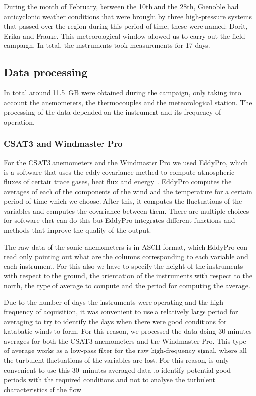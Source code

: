 During the month of February, between the 10th and the 28th,  Grenoble had anticyclonic weather conditions that were brought by three high-pressure systems that passed over the region during this period of time, these were named: Dorit, Erika and Frauke. This meteorological window allowed us to carry out the field campaign. In total, the instruments took measurements for 17 days.

\subsection{Data processing}

In total around 11.5~GB were obtained during the campaign, only taking into account the anemometers, the thermocouples and the meteorological station. The processing of the data depended on the instrument and its frequency of operation. 

\subsubsection{CSAT3 and Windmaster Pro}

For the CSAT3 anemometers and the Windmaster Pro we used EddyPro, which is a software that uses the eddy covariance method to compute atmospheric fluxes of certain trace gases, heat flux and energy~\citep{burba2013eddy}. EddyPro computes the averages of each of the components of the wind and the temperature for a certain period of time which we choose. After this, it computes the fluctuations of the variables and computes the covariance between them. There are multiple choices for software that can do this but EddyPro integrates different functions and methods that improve the quality of the output. 

The raw data of the sonic anemometers is in ASCII format, which EddyPro con read only pointing out what are the columns corresponding to each variable and each instrument. For this also we have to specify the height of the instruments with respect to the ground, the orientation of the instruments with respect to the north, the type of average to compute and the period for computing the average. 

Due to the number of days the instruments were operating and the high frequency of acquisition, it was convenient to use a relatively large period for averaging to try to identify the days when there were good conditions for katabatic winds to form. For this reason, we processed the data doing 30 minutes averages for both the CSAT3 anemometers and the Windmaster Pro. This type of average works as a low-pass filter for the raw high-frequency signal, where all the turbulent fluctuations of the variables are lost. For this reason, is only convenient to use this 30~minutes averaged data to identify potential good periods with the required conditions and not to analyse the turbulent characteristics of the flow

